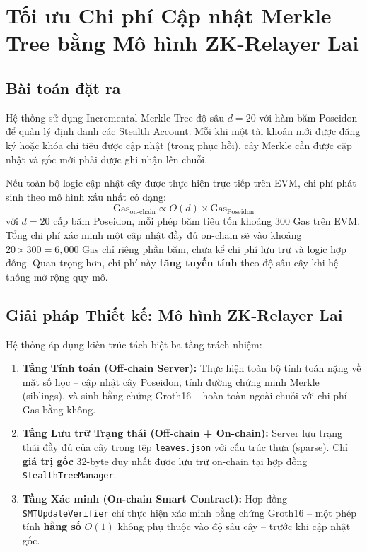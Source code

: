 \documentclass[../DoAn.tex]{subfiles}
\begin{document}
\section{Tối ưu Chi phí Cập nhật Merkle Tree bằng Mô hình ZK-Relayer Lai}
\label{sec:merkle_hybrid}

\subsection{Bài toán đặt ra}
\label{subsec:merkle_problem}

Hệ thống sử dụng Incremental Merkle Tree độ sâu $d = 20$ với hàm băm Poseidon để quản lý định danh các Stealth Account. Mỗi khi một tài khoản mới được đăng ký hoặc khóa chi tiêu được cập nhật (trong phục hồi), cây Merkle cần được cập nhật và gốc mới phải được ghi nhận lên chuỗi.

Nếu toàn bộ logic cập nhật cây được thực hiện trực tiếp trên EVM, chi phí phát sinh theo mô hình xấu nhất có dạng:
\[
    \text{Gas}_{\text{on-chain}} \propto O(d) \times \text{Gas}_{\text{Poseidon}}
\]
với $d = 20$ cấp băm Poseidon, mỗi phép băm tiêu tốn khoảng 300 Gas trên EVM. Tổng chi phí xác minh một cập nhật đầy đủ on-chain sẽ vào khoảng $20 \times 300 = 6{,}000$ Gas chỉ riêng phần băm, chưa kể chi phí lưu trữ và logic hợp đồng. Quan trọng hơn, chi phí này \textbf{tăng tuyến tính} theo độ sâu cây khi hệ thống mở rộng quy mô.

\subsection{Giải pháp Thiết kế: Mô hình ZK-Relayer Lai}
\label{subsec:merkle_solution}

Hệ thống áp dụng kiến trúc tách biệt ba tầng trách nhiệm:

\begin{enumerate}
    \item \textbf{Tầng Tính toán (Off-chain Server):} Thực hiện toàn bộ tính toán nặng về mặt số học -- cập nhật cây Poseidon, tính đường chứng minh Merkle (siblings), và sinh bằng chứng Groth16 -- hoàn toàn ngoài chuỗi với chi phí Gas bằng không.

    \item \textbf{Tầng Lưu trữ Trạng thái (Off-chain + On-chain):} Server lưu trạng thái đầy đủ của cây trong tệp \texttt{leaves.json} với cấu trúc thưa (sparse). Chỉ \textbf{giá trị gốc} 32-byte duy nhất được lưu trữ on-chain tại hợp đồng \texttt{StealthTreeManager}.

    \item \textbf{Tầng Xác minh (On-chain Smart Contract):} Hợp đồng \texttt{SMTUpdateVerifier} chỉ thực hiện xác minh bằng chứng Groth16 -- một phép tính \textbf{hằng số} $O(1)$ không phụ thuộc vào độ sâu cây -- trước khi cập nhật gốc.
\end{enumerate}
\end{document}
